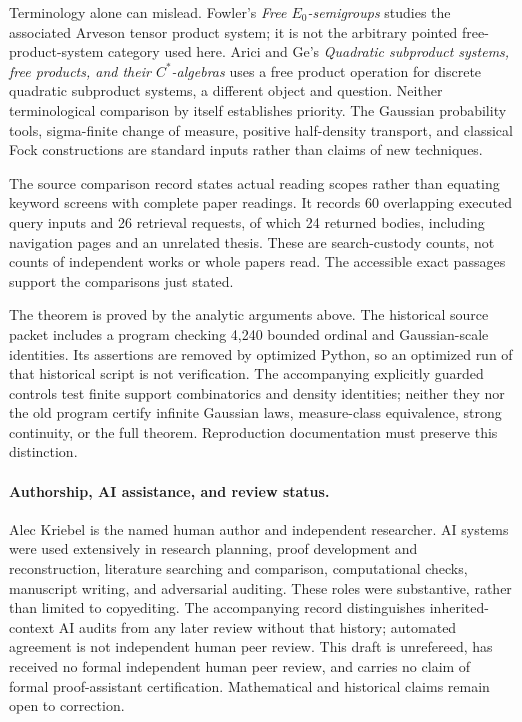 \documentclass[11pt]{article}
\theoremstyle{remark}\newtheorem{remark}[theorem]{Remark}
\begin{document}
Terminology alone can mislead. Fowler's \emph{Free $E_0$-semigroups}
\cite{Fowler1995} studies the associated Arveson tensor product system; it is
not the arbitrary pointed free-product-system category used here.
Arici and Ge's \emph{Quadratic subproduct systems, free products, and their
$C^*$-algebras} \cite{AriciGe2026} uses a free product operation for discrete
quadratic subproduct systems, a different object and question. Neither
terminological comparison by itself establishes priority. The Gaussian
probability tools, sigma-finite change of measure, positive half-density
transport, and classical Fock constructions are standard inputs rather than
claims of new techniques.

The source comparison record states actual reading scopes rather than
equating keyword screens with complete paper readings. It records 60
overlapping executed query inputs and 26 retrieval requests, of which 24
returned bodies, including navigation pages and an unrelated thesis. These
are search-custody counts, not counts of independent works or whole papers
read. The accessible exact passages support the comparisons just stated.

The theorem is proved by the analytic arguments above. The historical source
packet includes a program checking 4,240 bounded ordinal and Gaussian-scale
identities. Its assertions are removed by optimized Python, so an optimized
run of that historical script is not verification. The accompanying explicitly
guarded controls test finite support combinatorics and density identities; neither
they nor the old program certify infinite Gaussian laws, measure-class
equivalence, strong continuity, or the full theorem. Reproduction documentation
must preserve this distinction.

\paragraph{Authorship, AI assistance, and review status.}
Alec Kriebel is the named human author and independent researcher. AI systems
were used extensively in research planning, proof development and reconstruction,
literature searching and comparison, computational checks, manuscript writing,
and adversarial auditing. These roles were substantive, rather than limited to
copyediting. The accompanying record distinguishes inherited-context AI audits
from any later review without that history; automated agreement is not
independent human peer review. This draft is unrefereed, has received no formal
independent human peer review, and carries no claim of formal proof-assistant
certification. Mathematical and historical claims remain open to correction.
\end{document}
